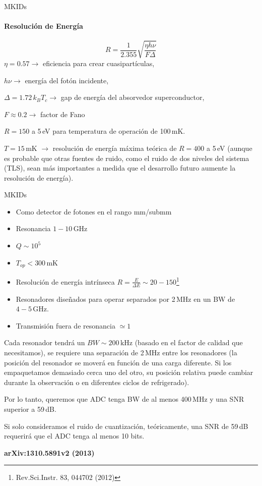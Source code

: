 \documentclass[ignorenonframetext,12pt]{beamer}
\begin{document}
\begin{frame}{MKIDs}
				\framesubtitle{Resolución de Energía}
												\begin{equation}
																R = \frac{1}{2.355}\sqrt{\frac{\eta h \nu}{F
																\Delta}}
												\end{equation}
				$\eta = 0.57 \to$ eficiencia para crear cuasipartículas,

				$h\nu \to$ energía del fotón incidente,

				$\Delta = 1.72\,k_BT_c \to$ gap de energía del absorvedor superconductor,

				$F \approx 0.2 \to$ factor de Fano

				$R=150$ a 5\,eV para temperatura de operación de 100\,mK.

				$T = 15$\,mK $\to$ resolución de energía máxima teórica de \alert{$R = 400$ a
				5\,eV} (aunque es probable que otras fuentes de ruido, como el ruido de
				dos niveles del sistema (TLS), sean más importantes a medida que el
				desarrollo futuro aumente	la resolución de energía).

\end{frame}
\begin{frame}{MKIDs}
				\scriptsize{\begin{itemize}
								\item Como detector de fotones en el rango mm/submm
								\item Resonancia  $1-10\,\text{GHz}$
								\item $Q \sim 10^5$
								\item $T_{op} < 300\,\text{mK}$
								\item Resolución de energía intrínseca $R = \frac{E}{\Delta E} \sim
												20-150$\footnote{Rev.Sci.Instr. 83, 044702 (2012)}
								\item Resonadores diseñados para operar separados por 2\,MHz en
												un BW de $4-5\,\text{GHz}$.
								\item Transmisión fuera de resonancia $\simeq 1$
				\end{itemize}
				Cada resonador tendrá un $BW \sim 200\,\text{kHz}$ (\alert{basado en el
				factor de calidad que necesitamos}), se requiere una separación de
				2\,MHz entre los resonadores (la posición del resonador se moverá en
				función de una carga diferente. Si los empaquetamos demasiado cerca uno
				del otro, su posición relativa puede cambiar durante la observación o
				en diferentes ciclos de refrigerado).

				Por lo tanto, queremos que ADC tenga BW de al menos 400\,MHz y una SNR
				superior a 59\,dB.

				Si solo consideramos el ruido de cuantización, teóricamente, una SNR de
				59\,dB requerirá que el ADC tenga al menos 10 bits.
				}
				\tiny{\textbf{arXiv:1310.5891v2 (2013)}}
\end{frame}
\end{document}
